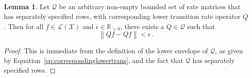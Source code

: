 \documentclass[10pt]{paper}
\theoremstyle{definition}
\newtheorem{lemma}[theorem]{Lemma}
\newcommand{\reals}{\mathbb{R}}
\newcommand{\realspos}{\reals_{>0}}
\newcommand{\states}{\mathcal{X}}
\newcommand{\gambles}{\mathcal{L}}
\newcommand{\gamblesX}{\gambles(\states)}
\newcommand{\rateset}{\mathcal{Q}}
\newcommand{\lrate}{\underline{Q}}
\newcommand{\norm}[1]{\left\lVert #1 \right\rVert}
\begin{document}
\begin{lemma}\label{lemma:rateset_has_arginf}
Let $\rateset$ be an arbitrary non-empty bounded set of rate matrices that has separately specified rows, with corresponding lower transition rate operator $\lrate$. Then for all $f\in\gamblesX$ and $\epsilon\in\realspos$, there exists a $Q\in\rateset$ such that
\begin{equation*}
\norm{\lrate f - Qf} < \epsilon\,.
\end{equation*}
\end{lemma}
\begin{proof}
This is immediate from the definition of the lower envelope of $\rateset$, as given by Equation~\eqref{eq:correspondinglowertrans}, and the fact that $\rateset$ has separately specified rows.
\end{proof}
\end{document}
